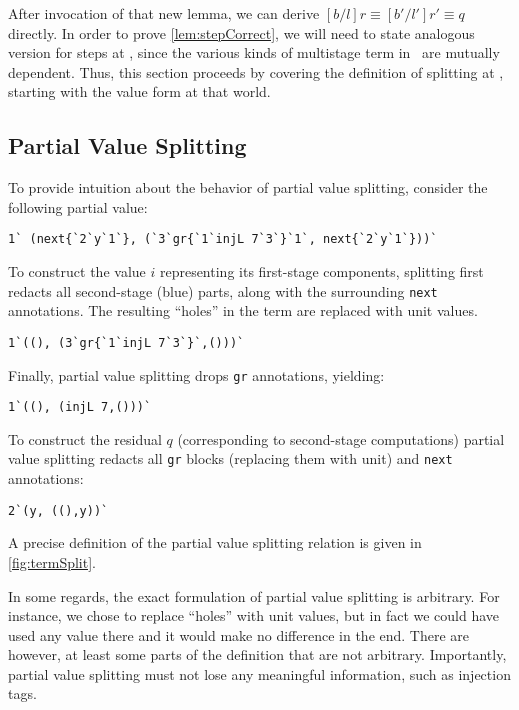 \begin{abstrsyn}
After invocation of that new lemma, we can derive $[b/l]r \equiv [b'/l']r' \equiv q$ directly.
In order to prove \ref{lem:stepCorrect},
we will need to state analogous version for steps at \bbonem,
since the various kinds of multistage term in \lang\ are mutually dependent.
Thus, this section proceeds by covering the definition of splitting at \bbonem, 
starting with the value form at that world.

\subsection{Partial Value Splitting}
\label{sec:masking}

To provide intuition about the behavior of partial value splitting, consider the
following partial value:
\begin{lstlisting}
1` (next{`2`y`1`}, (`3`gr{`1`injL 7`3`}`1`, next{`2`y`1`}))`
\end{lstlisting}
To construct the value $i$ representing its first-stage components,
splitting first redacts all second-stage (blue) parts, along with the
surrounding \texttt{next} annotations. 
The resulting ``holes'' in the term are replaced with
unit values.
\begin{lstlisting}
1`((), (3`gr{`1`injL 7`3`}`,()))`
\end{lstlisting}
Finally, partial value splitting drops \texttt{gr} annotations, yielding:
\begin{lstlisting}
1`((), (injL 7,()))`
\end{lstlisting}
To construct the residual $q$ (corresponding to second-stage computations) partial value splitting redacts all \texttt{gr} blocks
(replacing them with unit) and \texttt{next} annotations:
\begin{lstlisting}
2`(y, ((),y))`
\end{lstlisting}
A precise definition of the partial value splitting relation is given in
\ref{fig:termSplit}.

In some regards, the exact formulation of partial value splitting is arbitrary.
For instance, we chose to replace ``holes'' with unit values,
but in fact we could have used any value there and it would make no difference in the end.
There are however, at least some parts of the definition that are not arbitrary.
Importantly, partial value splitting must not lose any meaningful information,
such as injection tags.


\end{abstrsyn}
